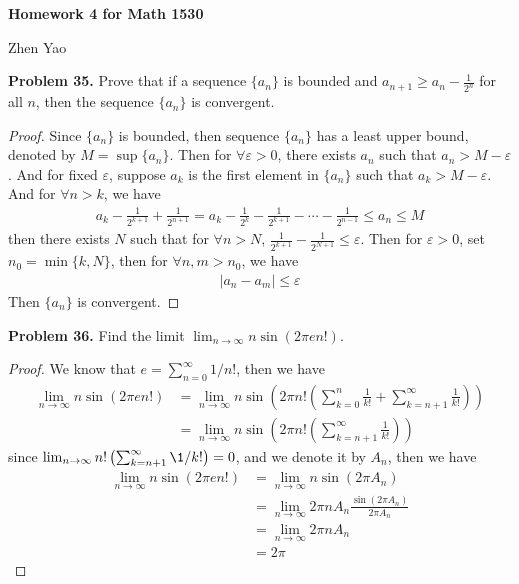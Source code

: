 \documentclass[12pt,leqno]{amsart}
\begin{document}
\centerline{\bf Homework 4 for Math 1530}
\centerline{Zhen Yao}

\bigskip

\noindent
{\bf Problem 35.}
Prove that if a sequence $\{ a_n\}$ is bounded and $\displaystyle a_{n+1}\geq a_n-\frac{1}{2^n}$
for all $n$, then the sequence $\{a_n\}$ is convergent.
\begin{proof}
Since $\{a_n\}$ is bounded, then sequence $\{a_n\}$ has a least upper bound, denoted by $M = \sup \{a_n\}$. Then for $\forall \varepsilon > 0$, there exists $a_n$ such that $a_n > M - \varepsilon$. And  for fixed $\varepsilon$, suppose $a_k$ is the first element in $\{a_n\}$ such that $a_k > M - \varepsilon$. And for $\forall n > k$, we have  
\begin{align*}
    a_k - \frac{1}{2^{k+1}} + \frac{1}{2^{n+1}} = a_k - \frac{1}{2^k} - \frac{1}{2^{k+1}} - \cdots - \frac{1}{2^{n-1}} \leq a_n \leq M
\end{align*}
then there exists $N$ such that for $\forall n > N$, $\frac{1}{2^{k+1}} - \frac{1}{2^{N+1}} \leq \varepsilon$. Then for $\varepsilon > 0$, set $n_0 = \min \{k, N\}$, then for $\forall n, m > n_0$, we have
\begin{align*}
    |a_n - a_m| \leq \varepsilon
\end{align*}
Then $\{a_n\}$ is convergent.
\end{proof}

\medskip

\noindent
{\bf Problem 36.}
Find the limit
$\displaystyle\lim_{n\to\infty} n\sin(2\pi e n!)$.
\begin{proof}
We know that $e = \sum^\infty_{n=0}1/n!$, then we have 
\begin{align*}
    \lim_{n\to\infty} n\sin(2\pi e n!) & = \lim_{n\to\infty} n\sin\left(2\pi n! \left(\sum^n_{k=0}\frac{1}{k!} + \sum^\infty_{k=n+1}\frac{1}{k!} \right)\right) \\
    & = \lim_{n\to\infty} n\sin\left(2\pi n! \left( \sum^\infty_{k=n+1}\frac{1}{k!} \right)\right)
\end{align*}
since $\lim_{n\to\infty} n! \left( \sum^\infty_{k=n+1}\1/k! \right) = 0$, and we denote it by $A_n$, then we have
\begin{align*}
    \lim_{n\to\infty} n\sin(2\pi e n!) & = \lim_{n\to\infty} n\sin(2\pi A_n) \\
    & = \lim_{n\to\infty} 2\pi n A_n \frac{\sin(2\pi A_n)}{2\pi A_n} \\
    & = \lim_{n\to\infty} 2\pi n A_n \\
    & = 2 \pi
\end{align*}
\end{proof}
\end{document}
